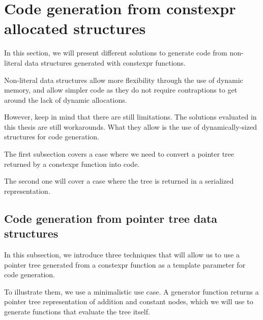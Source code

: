 \documentclass[../main]{subfiles}
\begin{document}
\section{
  Code generation from constexpr allocated structures
}

In this section, we will present different solutions to generate code
from non-literal data structures generated with \gls{constexpr} functions.

Non-literal data structures allow more flexibility through the use of
dynamic memory, and allow simpler code as they do not require contraptions
to get around the lack of dynamic allocations.


However, keep in mind that there are still limitations.
The solutions evaluated in this thesis are still workarounds.
What they allow is the use of dynamically-sized structures for code generation.

The first subsection covers a case where we need to convert a
pointer tree returned by a \gls{constexpr} function into code.

The second one will cover a case where the tree is returned in a serialized
representation.

\subsection{
  Code generation from pointer tree data structures
}

\label{lbl:ptr-tree-codegen}

In this subsection, we introduce three techniques that will allow us to use
a pointer tree generated from a \gls{constexpr} function as a template parameter
for code generation.

To illustrate them, we use a minimalistic use case.
A generator function returns a pointer tree representation of addition and
constant nodes, which we will use to generate functions that evaluate
the tree itself.
\end{document}

